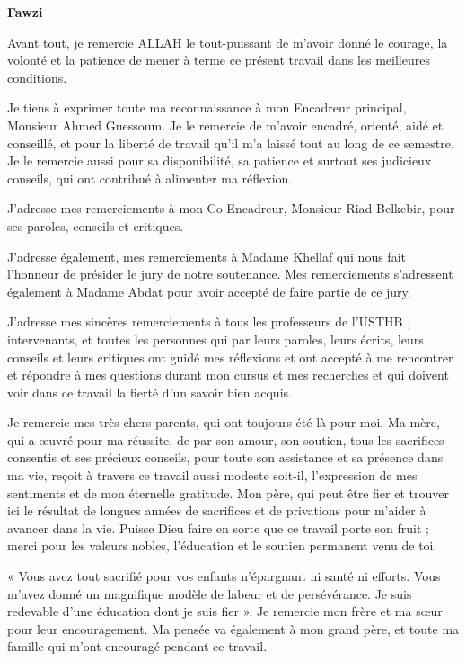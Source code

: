 
\begin{center}
    \Large 
    \textbf{Fawzi}
\end{center}

\vspace{1cm}

Avant tout, je remercie ALLAH le tout-puissant de m'avoir donné le courage, la volonté et la patience de mener à terme ce présent travail dans les meilleures conditions.

Je tiens à exprimer toute ma reconnaissance à mon Encadreur principal, Monsieur Ahmed Guessoum. Je le remercie de m’avoir encadré, orienté, aidé et conseillé, et pour la liberté de travail qu'il m'a laissé tout au long de ce semestre. 
Je le remercie aussi pour sa disponibilité, sa patience et surtout ses judicieux conseils, qui ont contribué à alimenter ma réflexion.

J’adresse mes remerciements à mon Co-Encadreur, Monsieur Riad Belkebir, pour ses paroles, conseils et critiques.

J'adresse également, mes remerciements à Madame Khellaf qui nous fait l'honneur de présider le jury de notre soutenance. Mes remerciements s’adressent également à Madame Abdat pour avoir accepté de faire partie de ce jury.

J’adresse mes sincères remerciements à tous les professeurs de l'USTHB , intervenants, et toutes les personnes qui par leurs paroles, leurs écrits, leurs conseils et leurs critiques ont guidé mes réflexions et ont accepté à me rencontrer et répondre à mes questions durant mon cursus et mes recherches et qui doivent voir dans ce travail la fierté d'un savoir bien acquis.

Je remercie mes très chers parents, qui ont toujours été là pour moi. Ma mère, qui a œuvré pour ma réussite, de par son amour, son soutien, tous les sacrifices consentis et ses précieux conseils, pour toute son assistance et sa présence dans ma vie, reçoit à travers ce travail aussi modeste soit-il, l'expression de mes sentiments et de mon éternelle gratitude. Mon père, qui peut être fier et trouver ici le résultat de longues années de sacrifices et de privations pour m'aider à avancer dans la vie. Puisse Dieu faire en sorte que ce travail porte son fruit ; merci pour les valeurs nobles, l'éducation et le soutien permanent venu de toi.

« Vous avez tout sacrifié pour vos enfants n’épargnant ni santé ni efforts. Vous m’avez donné un magnifique modèle de labeur et de persévérance. Je suis redevable d’une éducation dont je suis fier ».
Je remercie mon frère et ma sœur pour leur encouragement. Ma pensée va également à mon grand père, et toute ma famille qui m'ont encouragé pendant ce travail.

